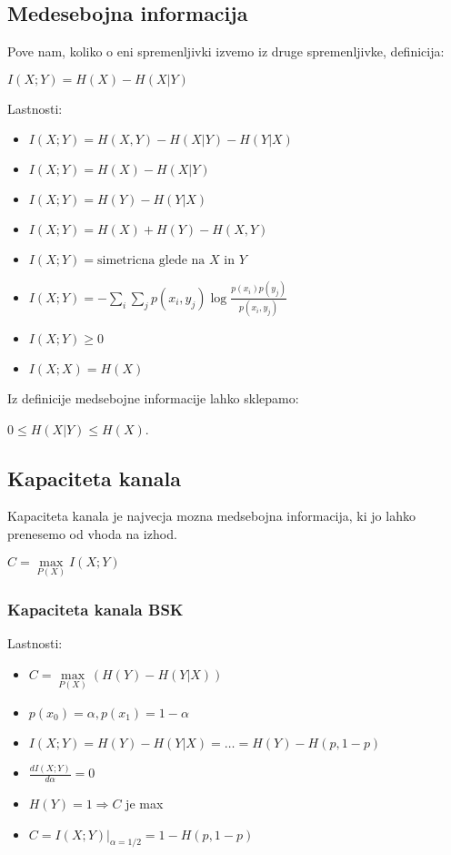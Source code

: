 \documentclass{article}
\begin{document}
\begin{multicols}{2}
	\subsection{Medesebojna informacija}
	Pove nam, koliko o eni spremenljivki izvemo iz druge spremenljivke,
	definicija:
	\begin{center}
		\begin{math}
			I(X;Y) = H(X) - H(X|Y)
		\end{math}
	\end{center}
	Lastnosti:
	\begin{itemize}
		\item $I(X;Y) = H(X, Y) - H(X|Y) - H(Y|X)$
		\item $I(X;Y) = H(X) - H(X|Y)$
		\item $I(X;Y) = H(Y) - H(Y|X)$
		\item $I(X;Y) = H(X) + H(Y) - H(X, Y)$
		\item $I(X;Y) = \text{simetricna glede na } X \text{ in } Y$
		\item $I(X;Y) = -\sum_i\sum_j p(x_i, y_j) \log \frac{p(x_i)p(y_j)}{p(x_i, y_j)}$
		\item $I(X;Y) \geq 0$
		\item $I(X;X) = H(X)$
	\end{itemize}
	Iz definicije medsebojne informacije lahko sklepamo:
	\begin{center}
		$0 \leq H(X|Y) \leq H(X)$.
	\end{center}

	\subsection{Kapaciteta kanala}
	Kapaciteta kanala je najvecja mozna medsebojna informacija, ki jo lahko prenesemo od vhoda na izhod.
	\begin{center}
		$C =\underset{P(X)}{\max} I(X;Y)$
	\end{center}
	\subsubsection{Kapaciteta kanala BSK}
	Lastnosti:
	\begin{itemize}
		\item $C =\underset{P(X)}{\max} (H(Y) - H(Y|X))$
		\item $p(x_0) = \alpha, p(x_1) = 1 - \alpha$
		\item $I(X;Y) = H(Y) - H(Y|X) = \dots = H(Y) - H(p, 1-p)$
		\item $\frac{dI(X;Y)}{d \alpha} = 0$
		\item $H(Y) = 1 \Rightarrow C$ je max
		\item $C=I(X;Y) |_{\alpha = 1/2} = 1 - H(p, 1-p)$
	\end{itemize}

\end{multicols}
\end{document}

